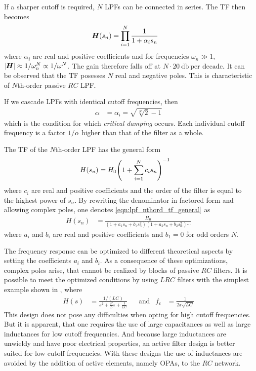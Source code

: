 If a sharper cutoff is required, $N$ \ac{LPF}s can be connected in series. The \ac{TF} then becomes
\begin{align}
  \bm{H}(s_n) &= \prod\limits_{i=1}^{N}\frac{1}{1+\alpha_i s_n}
\end{align}
where $\alpha_i$ are real and positive coefficients and for frequencies $\omega_n\gg 1$, $\abs{\bm{H}}\approx 1/\omega_n^N\propto 1/\omega^N$. The gain therefore falls off at $N\cdot\SI{20}{\decibel}\:\text{per decade}$. It can be observed that the \ac{TF} posesses $N$ real and negative poles. This is characteristic of $N$th-order passive $RC$ \ac{LPF}.

If we cascade \ac{LPF}s with identical cutoff frequencies, then
\begin{align}
  \alpha &= \alpha_i = \sqrt{\sqrt[N]{2}-1}
\end{align}
which is the condition for which \emph{critical damping} occurs. Each individual cutoff frequency is a factor $1/\alpha$ higher than that of the filter as a whole.

The \ac{TF} of the $N$th-order \ac{LPF} has the general form
\begin{align}
  H(s_n) &= H_0 \pqty{1 + \sum\limits_{i=1}^N c_i s_n}^{-1} \label{eqn:lpf_nthord_tf_general}
\end{align}
where $c_i$ are real and positive coefficients and the order of the filter is equal to the highest power of $s_n$. By rewriting the denominator in factored form and allowing complex poles, one denotes \autoref{eqn:lpf_nthord_tf_general} as
\begin{align}
  H(s_n) &= \frac{H_0}{(1+a_1s_n+b_1s_n^2)(1+a_2s_n+b_2s_n^2)\cdots} \label{eqn:lpf_nthord_tf_poles}
\end{align}
where $a_i$ and $b_i$ are real and positive coefficients and $b_1=0$ for odd orders $N$.

The frequency response can be optimized to different theoretical aspects by setting the coefficients $a_i$ and $b_i$. As a consequence of these optimizations, complex poles arise, that cannot be realized by blocks of passive $RC$ filters. It is possible to meet the optimized conditions by using $LRC$ filters with the simplest example shown in , where
\begin{align}
  &&H(s) &= \frac{1/(LC)}{s^2+\frac{R}{L}s+\frac{1}{LC}} &&\text{and} &f_c &= \frac{1}{2\pi\sqrt{LC}}&&
\end{align}
This design does not pose any difficulties when opting for high cutoff frequencies. But it is apparent, that one requires the use of large capacitances as well as large inductances for low cutoff frequencies. And because large inductances are unwieldy and have poor electrical properties, an active filter design is better suited for low cutoff frequencies. With these designs the use of inductances are avoided by the addition of active elements, namely \ac{OPA}s, to the $RC$ network.

